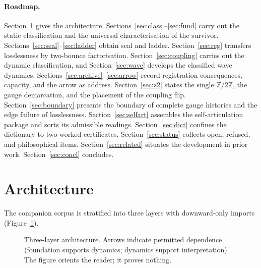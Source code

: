 \documentclass[11pt,a4paper]{article}
\theoremstyle{plain}
\theoremstyle{definition}
\theoremstyle{remark}
\newcommand{\Ztwo}{\mathbb{Z}/2\mathbb{Z}}
\begin{document}
\paragraph{Roadmap.}
Section~\ref{sec:arch} gives the architecture.
Sections~\ref{sec:class}--\ref{sec:fund} carry out the static
classification and the universal characterisation of the survivor.
Sections~\ref{sec:seal}--\ref{sec:ladder} obtain seal and ladder.
Section~\ref{sec:reg} transfers losslessness by two-bounce
factorisation.
Section~\ref{sec:coupling} carries out the dynamic classification, and
Section~\ref{sec:wave} develops the classified wave dynamics.
Sections~\ref{sec:archive}--\ref{sec:arrow} record registration
consequences, capacity, and the arrow as address.
Section~\ref{sec:z2} states the single $\Ztwo$, the gauge demarcation,
and the placement of the coupling flip.
Section~\ref{sec:boundary} presents the boundary of complete gauge
histories and the edge failure of losslessness.
Section~\ref{sec:selfart} assembles the self-articulation package and
sorts its admissible readings.
Section~\ref{sec:dict} confines the dictionary to two worked
certificates.
Section~\ref{sec:status} collects open, refused, and philosophical items.
Section~\ref{sec:related} situates the development in prior work.
Section~\ref{sec:concl} concludes.


\section{Architecture}
\label{sec:arch}

The companion corpus is stratified into three layers with downward-only
imports (Figure~\ref{fig:layers}).

\begin{figure}[ht]
\centering
{}
\caption{Three-layer architecture. Arrows indicate permitted dependence
(foundation supports dynamics; dynamics support interpretation). The
figure orients the reader; it proves nothing.}
\label{fig:layers}
\end{figure}
\end{document}
